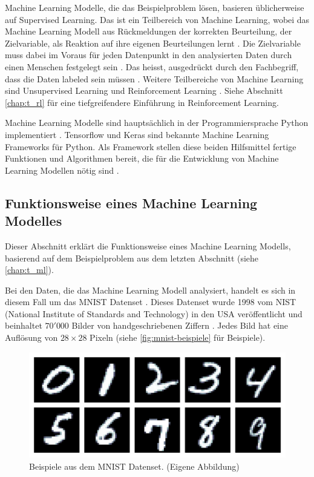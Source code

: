 Machine Learning Modelle, die das Beispielproblem lösen, basieren üblicherweise
auf Supervised Learning. Das ist ein Teilbereich von Machine Learning, wobei das
Machine Learning Modell aus Rückmeldungen der korrekten Beurteilung, der
Zielvariable, als Reaktion auf ihre eigenen Beurteilungen lernt
\cite{liu_supervised_2012}. Die Zielvariable muss dabei im Voraus für jeden
Datenpunkt in den analysierten Daten durch einen Menschen festgelegt sein
\cite{trahasch_31_2020}. Das heisst, ausgedrückt durch den Fachbegriff, dass
die Daten labeled sein müssen \cite{serrano_21_2021}. Weitere Teilbereiche
von Machine Learning sind Unsupervised Learning und Reinforcement Learning
\cite{arora_supervised_2020}. Siehe Abschnitt \ref{chap:t_rl} für eine
tiefgreifendere Einführung in Reinforcement Learning.
 
Machine Learning Modelle sind hauptsächlich in der Programmiersprache Python
implementiert \cite{sadie_why_2019}. Tensorflow und Keras sind bekannte
Machine Learning Frameworks für Python. Als Framework stellen diese beiden
Hilfsmittel fertige Funktionen und Algorithmen bereit, die für die Entwicklung
von Machine Learning Modellen nötig sind
\cite{noauthor_tensorflow_2015}\cite{noauthor_keras_2015}.
 
 
\subsection{Funktionsweise eines Machine Learning Modelles}\label{sub:t_ml_func}
Dieser Abschnitt erklärt die Funktionsweise eines Machine Learning Modells,
basierend auf dem Beispielproblem aus dem letzten Abschnitt (siehe \ref{chap:t_ml}).
 
Bei den Daten, die das Machine Learning Modell analysiert, handelt es sich in
diesem Fall um das MNIST Datenset \cite{lecun_mnist_1998}. Dieses Datenset
wurde 1998 vom NIST (National Institute of Standards and Technology) in den USA
veröffentlicht und beinhaltet $70'000$ Bilder von handgeschriebenen Ziffern
\cite{lecun_gradient-based_1998}. Jedes Bild hat eine Auflösung von $28\times28$
Pixeln (siehe \autoref{fig:mnist-beispiele} für Beispiele).
 
\begin{figure}[!ht]
   \centering
   \includegraphics[width=\textwidth]{images/theorie/mnist-beispiele.png}
   \caption{Beispiele aus dem MNIST Datenset. (Eigene Abbildung)}\label{fig:mnist-beispiele}
\end{figure}
 
